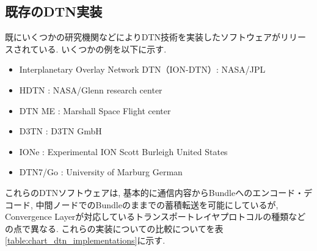 \subsection{既存のDTN実装}
\label{section:既存のDTN実装}
既にいくつかの研究機関などによりDTN技術を実装したソフトウェアがリリースされている.  いくつかの例を以下に示す.  
\begin{itemize}
    \item Interplanetary Overlay Network DTN（ION-DTN）: NASA/JPL
    \item HDTN : NASA/Glenn research center
    \item DTN ME : Marshall Space Flight center
    \item \textmu D3TN : D3TN GmbH
    \item IONe : Experimental ION Scott Burleigh United States 
    \item DTN7/Go : University of Marburg German
\end{itemize}
これらのDTNソフトウェアは,  基本的に通信内容からBundleへのエンコード・デコード,  
中間ノードでのBundleのままでの蓄積転送を可能にしているが,  
Convergence Layerが対応しているトランスポートレイヤプロトコルの種類などの点で異なる. 
これらの実装についての比較についてを表\ref{table:chart_dtn_implementations}に示す. 

